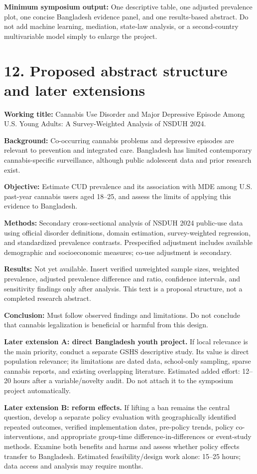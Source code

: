 \documentclass[10pt]{article}
\newcommand{\head}[1]{\section*{\color{navy}#1}}
\begin{document}
\textbf{Minimum symposium output:} One descriptive table, one adjusted prevalence plot, one concise Bangladesh evidence panel, and one results-based abstract. Do not add machine learning, mediation, state-law analysis, or a second-country multivariable model simply to enlarge the project.
\newpage
\head{12. Proposed abstract structure and later extensions}
\textbf{Working title:} Cannabis Use Disorder and Major Depressive Episode Among U.S. Young Adults: A Survey-Weighted Analysis of NSDUH 2024.

\textbf{Background:} Co-occurring cannabis problems and depressive episodes are relevant to prevention and integrated care. Bangladesh has limited contemporary cannabis-specific surveillance, although public adolescent data and prior research exist.

\textbf{Objective:} Estimate CUD prevalence and its association with MDE among U.S. past-year cannabis users aged 18--25, and assess the limits of applying this evidence to Bangladesh.

\textbf{Methods:} Secondary cross-sectional analysis of NSDUH 2024 public-use data using official disorder definitions, domain estimation, survey-weighted regression, and standardized prevalence contrasts. Prespecified adjustment includes available demographic and socioeconomic measures; co-use adjustment is secondary.

\textbf{Results:} Not yet available. Insert verified unweighted sample sizes, weighted prevalence, adjusted prevalence difference and ratio, confidence intervals, and sensitivity findings only after analysis. This text is a proposal structure, not a completed research abstract.

\textbf{Conclusion:} Must follow observed findings and limitations. Do not conclude that cannabis legalization is beneficial or harmful from this design.

\textbf{Later extension A: direct Bangladesh youth project.} If local relevance is the main priority, conduct a separate GSHS descriptive study. Its value is direct population relevance; its limitations are dated data, school-only sampling, sparse cannabis reports, and existing overlapping literature. Estimated added effort: 12--20 hours after a variable/novelty audit. Do not attach it to the symposium project automatically.

\textbf{Later extension B: reform effects.} If lifting a ban remains the central question, develop a separate policy evaluation with geographically identified repeated outcomes, verified implementation dates, pre-policy trends, policy co-interventions, and appropriate group-time difference-in-differences or event-study methods. Examine both benefits and harms and assess whether policy effects transfer to Bangladesh. Estimated feasibility/design work alone: 15--25 hours; data access and analysis may require months.
\end{document}
